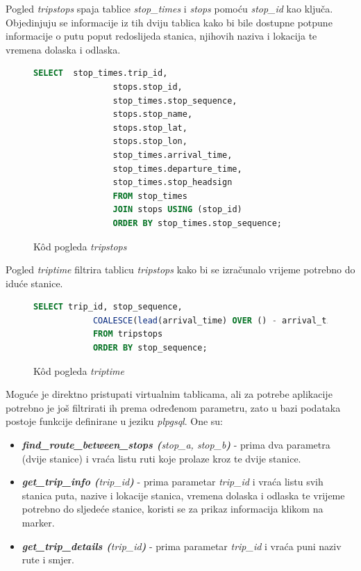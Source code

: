 \documentclass[zavrsnirad]{fer}
\begin{document}
Pogled \textit{tripstops} spaja tablice \textit{stop\_times} i \textit{stops} pomoću \textit{stop\_id} kao ključa. Objedinjuju se informacije iz tih dviju tablica kako bi bile dostupne potpune informacije o putu poput redoslijeda stanica, njihovih naziva i lokacija te vremena dolaska i odlaska.
\begin{figure}[h]
	\centering
	\begin{minipage}{0.8\linewidth}
		\begin{lstlisting}[language=SQL]
 		SELECT  stop_times.trip_id,
				stops.stop_id,
				stop_times.stop_sequence,
				stops.stop_name,
				stops.stop_lat,
				stops.stop_lon,
				stop_times.arrival_time,
				stop_times.departure_time,
				stop_times.stop_headsign
				FROM stop_times
				JOIN stops USING (stop_id)
				ORDER BY stop_times.stop_sequence;
		\end{lstlisting}
	\end{minipage}
	\caption{K\^od pogleda \textit{tripstops}}
	\label{slk:tripstops}
\end{figure}

Pogled \textit{triptime} filtrira tablicu \textit{tripstops} kako bi se izračunalo vrijeme potrebno do iduće stanice.
\begin{figure}[h]
	\centering
	\begin{minipage}{0.8\linewidth}
		\begin{lstlisting}[language=SQL]
			SELECT trip_id, stop_sequence,
			COALESCE(lead(arrival_time) OVER () - arrival_time, '00:00:00'::interval) AS time_till_next_stop
			FROM tripstops
			ORDER BY stop_sequence;
		\end{lstlisting}
	\end{minipage}
	\caption{K\^od pogleda \textit{triptime}}
	\label{slk:triptime}
\end{figure}

Moguće je direktno pristupati virtualnim tablicama, ali za potrebe aplikacije potrebno je još filtrirati ih prema određenom parametru, zato u bazi podataka postoje funkcije definirane u jeziku\textit{ plpgsql}.
One su: 
\begin{itemize}
	\item \textit{\textbf{find\_route\_between\_stops (}stop\_a, stop\_b\textbf{)}} - prima dva parametra (dvije stanice) i vraća listu ruti koje prolaze kroz te dvije stanice.
	\item \textit{\textbf{get\_trip\_info (}trip\_id\textbf{)}} - prima parametar \textit{trip\_id} i vraća listu svih stanica puta, nazive i lokacije stanica, vremena dolaska i odlaska te vrijeme potrebno do sljedeće stanice, koristi se za prikaz informacija klikom na marker.
	\item \textit{\textbf{get\_trip\_details (}trip\_id\textbf{)}} - prima parametar \textit{trip\_id} i vraća puni naziv rute i smjer.
\end{itemize}
\end{document}
